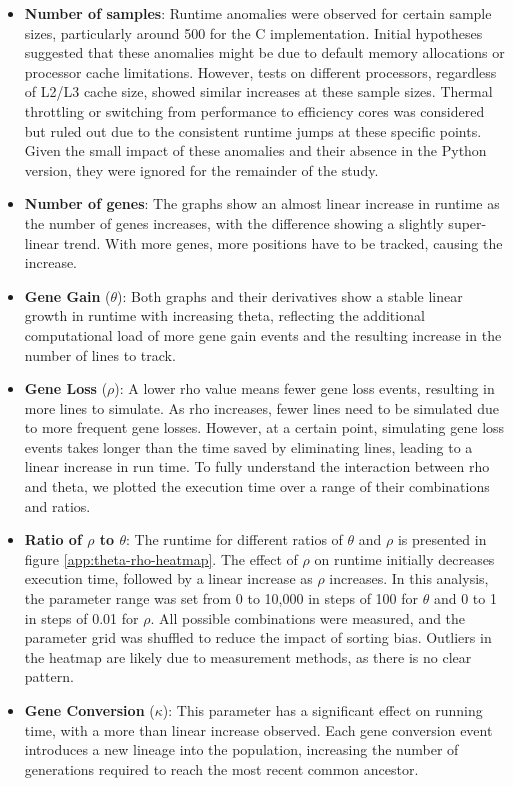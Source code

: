 \begin{itemize}
    \item \textbf{Number of samples}: Runtime anomalies were observed for certain sample sizes, particularly around 500 for the C implementation.
          Initial hypotheses suggested that these anomalies might be due to default memory allocations or processor cache limitations.
          However, tests on different processors, regardless of L2/L3 cache size, showed similar increases at these sample sizes.
          Thermal throttling or switching from performance to efficiency cores was considered but ruled out due to the consistent runtime jumps at these specific points.
          Given the small impact of these anomalies and their absence in the Python version, they were ignored for the remainder of the study.

    \item \textbf{Number of genes}: The graphs show an almost linear increase in runtime as the number of genes increases, with the difference showing a slightly super-linear trend.
          With more genes, more positions have to be tracked, causing the increase.

    \item \textbf{Gene Gain} ($\theta$): Both graphs and their derivatives show a stable linear growth in runtime with increasing theta, reflecting the additional computational load of more gene gain events and the resulting increase in the number of lines to track.

    \item \textbf{Gene Loss} ($\rho$): A lower rho value means fewer gene loss events, resulting in more lines to simulate. As rho increases, fewer lines need to be simulated due to more frequent gene losses.
          However, at a certain point, simulating gene loss events takes longer than the time saved by eliminating lines, leading to a linear increase in run time.
          To fully understand the interaction between rho and theta, we plotted the execution time over a range of their combinations and ratios.

    \item \textbf{Ratio of $\rho$ to $\theta$}: The runtime for different ratios of $\theta$ and $\rho$ is presented in figure \ref{app:theta-rho-heatmap}.
          The effect of $\rho$ on runtime initially decreases execution time, followed by a linear increase as $\rho$ increases.
          In this analysis, the parameter range was set from 0 to 10,000 in steps of 100 for $\theta$ and 0 to 1 in steps of 0.01 for $\rho$.
          All possible combinations were measured, and the parameter grid was shuffled to reduce the impact of sorting bias.
          Outliers in the heatmap are likely due to measurement methods, as there is no clear pattern.\\
          \newpage
    \item \textbf{Gene Conversion} ($\kappa$): This parameter has a significant effect on running time, with a more than linear increase observed.
          Each gene conversion event introduces a new lineage into the population, increasing the number of generations required to reach the most recent common ancestor.


\end{itemize}
